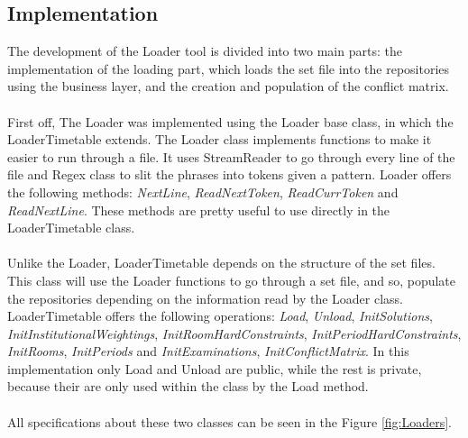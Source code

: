 \subsection{Implementation}

The development of the Loader tool is divided into two main parts: the implementation of the loading part, which loads the set file into the repositories using the business layer, and the creation and population of the conflict matrix.\\
\\
First off, The Loader was implemented using the Loader base class, in which the LoaderTimetable extends. The Loader class implements functions to make it easier to run through a file. It uses StreamReader \cite{Microsoft2015} to go through every line of the file and Regex \cite{Microsoft2015a} class to slit the phrases into tokens given a pattern. Loader offers the following methods: \textit{NextLine}, \textit{ReadNextToken}, \textit{ReadCurrToken} and \textit{ReadNextLine}. These methods are pretty useful to use directly in the LoaderTimetable class. \\
\\
Unlike the Loader, LoaderTimetable depends on the structure of the set files. This class will use the Loader functions to go through a set file, and so, populate the repositories depending on the information read by the Loader class. LoaderTimetable offers the following operations: \textit{Load}, \textit{Unload}, \textit{InitSolutions}, \textit{InitInstitutionalWeightings}, \textit{InitRoomHardConstraints}, \textit{InitPeriodHardConstraints}, \textit{InitRooms}, \textit{InitPeriods} and \textit{InitExaminations}, \textit{InitConflictMatrix}. In this implementation only Load and Unload are public, while the rest is private, because their are only used within the class by the Load method.\\
\\
All specifications about these two classes can be seen in the Figure \ref{fig:Loaders}.\\
\\
